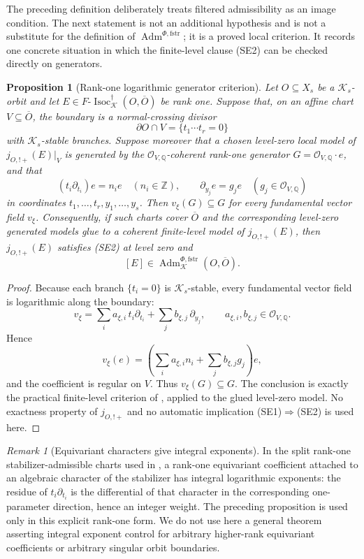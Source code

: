 \documentclass[11pt]{amsart}
\theoremstyle{plain}
\newtheorem{proposition}{Proposition}[section]
\theoremstyle{definition}
\theoremstyle{remark}
\newtheorem{remark}{Remark}[section]
\newcommand{\Isoc}{\operatorname{Isoc}}
\newcommand{\fstr}{\mathrm{fstr}}
\newcommand{\Adm}{\operatorname{Adm}}
\begin{document}
The preceding definition deliberately treats filtered admissibility as an image
condition.  The next statement is not an additional hypothesis and is not a
substitute for the definition of \(\Adm^{\Phi,\fstr}\); it is a proved local
criterion.  It records one concrete situation in which the finite-level clause
\textup{(SE2)} can be checked directly on generators.

\begin{proposition}[Rank-one logarithmic generator criterion]
\label{prop:rank-one-integral-exponent-SE2}
Let \(O\subseteq X_s\) be a \(\mathcal K_s\)-orbit and let
\(E\in F\text{-}\Isoc^\dagger_{\mathcal K}(O,\overline O)\) be rank one.
Suppose that, on an affine chart \(V\subseteq\overline O\), the boundary is a
normal-crossing divisor
\[
  \partial O\cap V=\{t_1\cdots t_r=0\}
\]
with \(\mathcal K_s\)-stable branches.  Suppose moreover that a chosen
level-zero local model of \(j_{O,!+}(E)|_V\) is generated by the
\(\mathcal O_{V,\mathbb Q}\)-coherent rank-one generator
\(G=\mathcal O_{V,\mathbb Q}\cdot e\), and that
\[
  (t_i\partial_{t_i})e=n_i e\quad (n_i\in\mathbb Z),
  \qquad
  \partial_{y_j}e=g_j e\quad(g_j\in\mathcal O_{V,\mathbb Q})
\]
in coordinates \(t_1,\ldots,t_r,y_1,\ldots,y_s\).  Then
\(v_\xi(G)\subseteq G\) for every fundamental vector field \(v_\xi\).
Consequently, if such charts cover \(\overline O\) and the corresponding
level-zero generated models glue to a coherent finite-level model of
\(j_{O,!+}(E)\), then \(j_{O,!+}(E)\) satisfies \textup{(SE2)} at level
zero and
\[
  [E]\in\Adm^{\Phi,\fstr}_{\mathcal K}(O,\overline O).
\]
\end{proposition}

\begin{proof}
Because each branch \(\{t_i=0\}\) is \(\mathcal K_s\)-stable, every
fundamental vector field is logarithmic along the boundary:
\[
  v_\xi=\sum_i a_{\xi,i}\,t_i\partial_{t_i}
       +\sum_j b_{\xi,j}\,\partial_{y_j},
  \qquad
  a_{\xi,i},b_{\xi,j}\in\mathcal O_{V,\mathbb Q}.
\]
Hence
\[
  v_\xi(e)=
  \left(\sum_i a_{\xi,i}n_i+\sum_j b_{\xi,j}g_j\right)e,
\]
and the coefficient is regular on \(V\).  Thus \(v_\xi(G)\subseteq G\).
The conclusion is exactly the practical finite-level criterion of
, applied to the glued level-zero model.
No exactness property of \(j_{O,!+}\) and no automatic implication
\textup{(SE1)}\(\Rightarrow\)\textup{(SE2)} is used here.
\end{proof}

\begin{remark}[Equivariant characters give integral exponents]
\label{rem:equivariant-characters-integral-exponents}
In the split rank-one stabilizer-admissible charts used in
, a rank-one equivariant coefficient attached to an
algebraic character of the stabilizer has integral logarithmic exponents: the
residue of \(t_i\partial_{t_i}\) is the differential of that character in the
corresponding one-parameter direction, hence an integer weight.  The preceding
proposition is used only in this explicit rank-one form.  We do not use here a
general theorem asserting integral exponent control for arbitrary higher-rank
equivariant coefficients or arbitrary singular orbit boundaries.
\end{remark}
\end{document}
